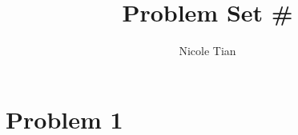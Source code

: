 \documentclass[12pt]{article}
\title{Problem Set \#}
\author{Nicole Tian}
\begin{document}
\maketitle                  %
\thispagestyle{empty}       %


\section*{Problem 1}
\end{document}
